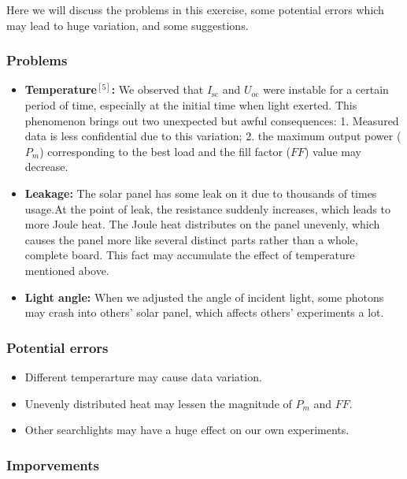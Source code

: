 \documentclass[a4paper]{article}
\begin{document}
Here we will discuss the problems in this exercise, some potential errors which may lead to huge variation, and some suggestions.

\subsubsection{Problems}

\begin{itemize}
	\item \textbf{Temperature$^{[5]}$:} We observed that $I_\text{sc}$ and $U_\text{oc}$ were instable for a certain period of time, especially at the initial time when light exerted.
	      This phenomenon brings out two unexpected but awful consequences: 1. Measured data is less confidential due to this variation;
	      2. the maximum output power ($P_m$) corresponding to the best load and the fill factor ($FF$) value may decrease.
	\item \textbf{Leakage:} The solar panel has some leak on it due to thousands of times usage.At the point of leak, the resistance suddenly increases,
	      which leads to more Joule heat. The Joule heat distributes on the panel unevenly, which causes the panel more like several distinct parts rather than a whole, complete board.
	      This fact may accumulate the effect of temperature mentioned above.
	\item \textbf{Light angle:} When we adjusted the angle of incident light, some photons may crash into others' solar panel, which affects others' experiments a lot.
\end{itemize}

\subsubsection{Potential errors}

\begin{itemize}
	\item Different temperarture may cause data variation.
	\item Unevenly distributed heat may lessen the magnitude of $P_m$ and $FF$.
	\item Other searchlights may have a huge effect on our own experiments.
\end{itemize}

\subsubsection{Imporvements}
\end{document}
